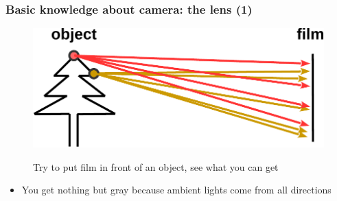 \begin{frame}
 \frametitle{Basic knowledge about camera: the lens (1)}
  \vspace{0.2in}
\begin{figure}
\begin{center}
	{\includegraphics[width=0.5\linewidth]{./figs/holeno.pdf}}
\end{center}
\caption{Try to put film in front of an object, see what you can get}
\end{figure}
\begin{itemize}
	\item {You get nothing but gray because ambient lights come from all directions}
\end{itemize}
\end{frame}


